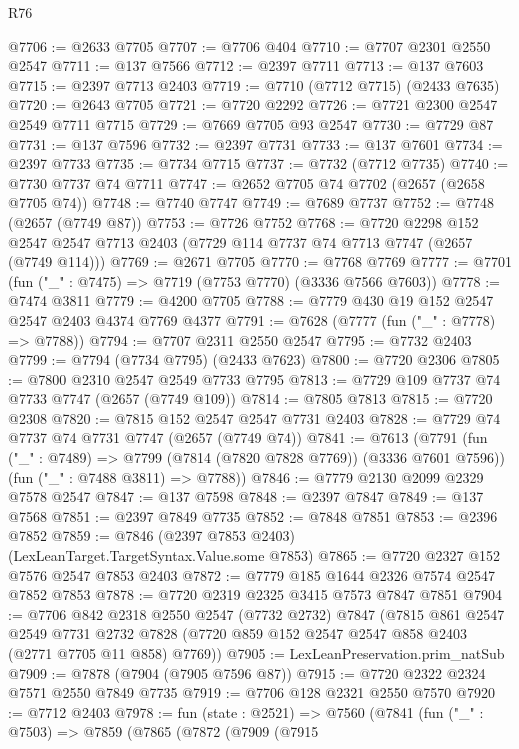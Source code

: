 \begin{lexlean}{R76}
\begin{coremodule}
@7706 := @2633 @7705
@7707 := @7706 @404
@7710 := @7707 @2301 @2550 @2547
@7711 := @137 @7566
@7712 := @2397 @7711
@7713 := @137 @7603
@7715 := @2397 @7713 @2403
@7719 := @7710 (@7712 @7715) (@2433 @7635)
@7720 := @2643 @7705
@7721 := @7720 @2292
@7726 := @7721 @2300 @2547 @2549 @7711 @7715
@7729 := @7669 @7705 @93 @2547
@7730 := @7729 @87
@7731 := @137 @7596
@7732 := @2397 @7731
@7733 := @137 @7601
@7734 := @2397 @7733
@7735 := @7734 @7715
@7737 := @7732 (@7712 @7735)
@7740 := @7730 @7737 @74 @7711
@7747 := @2652 @7705 @74 @7702 (@2657 (@2658 @7705 @74))
@7748 := @7740 @7747
@7749 := @7689 @7737
@7752 := @7748 (@2657 (@7749 @87))
@7753 := @7726 @7752
@7768 := @7720
    @2298
    @152
    @2547
    @2547
    @7713
    @2403
    (@7729 @114 @7737 @74 @7713 @7747 (@2657 (@7749 @114)))
@7769 := @2671 @7705
@7770 := @7768 @7769
@7777 := @7701 (fun ("_" : @7475) => @7719 (@7753 @7770) (@3336 @7566 @7603))
@7778 := @7474 @3811
@7779 := @4200 @7705
@7788 := @7779 @430 @19 @152 @2547 @2547 @2403 @4374 @7769 @4377
@7791 := @7628 (@7777 (fun ("_" : @7778) => @7788))
@7794 := @7707 @2311 @2550 @2547
@7795 := @7732 @2403
@7799 := @7794 (@7734 @7795) (@2433 @7623)
@7800 := @7720 @2306
@7805 := @7800 @2310 @2547 @2549 @7733 @7795
@7813 := @7729 @109 @7737 @74 @7733 @7747 (@2657 (@7749 @109))
@7814 := @7805 @7813
@7815 := @7720 @2308
@7820 := @7815 @152 @2547 @2547 @7731 @2403
@7828 := @7729 @74 @7737 @74 @7731 @7747 (@2657 (@7749 @74))
@7841 := @7613
    (@7791
      (fun ("_" : @7489) => @7799 (@7814 (@7820 @7828 @7769)) (@3336 @7601 @7596))
      (fun ("_" : @7488 @3811) => @7788))
@7846 := @7779 @2130 @2099 @2329 @7578 @2547
@7847 := @137 @7598
@7848 := @2397 @7847
@7849 := @137 @7568
@7851 := @2397 @7849 @7735
@7852 := @7848 @7851
@7853 := @2396 @7852
@7859 := @7846 (@2397 @7853 @2403) (LexLeanTarget.TargetSyntax.Value.some @7853)
@7865 := @7720 @2327 @152 @7576 @2547 @7853 @2403
@7872 := @7779 @185 @1644 @2326 @7574 @2547 @7852 @7853
@7878 := @7720 @2319 @2325 @3415 @7573 @7847 @7851
@7904 := @7706
    @842
    @2318
    @2550
    @2547
    (@7732 @2732)
    @7847
    (@7815
      @861
      @2547
      @2549
      @7731
      @2732
      @7828
      (@7720 @859 @152 @2547 @2547 @858 @2403 (@2771 @7705 @11 @858) @7769))
@7905 := LexLeanPreservation.prim_natSub
@7909 := @7878 (@7904 (@7905 @7596 @87))
@7915 := @7720 @2322 @2324 @7571 @2550 @7849 @7735
@7919 := @7706 @128 @2321 @2550 @7570
@7920 := @7712 @2403
@7978 := fun (state : @2521) =>
  @7560
    (@7841
      (fun ("_" : @7503) =>
      @7859
        (@7865
          (@7872
            (@7909
              (@7915

\end{coremodule}
\end{lexlean}
